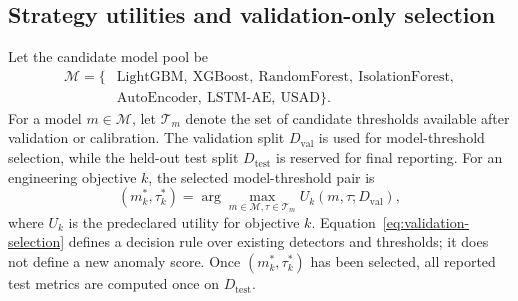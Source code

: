 \subsection{Strategy utilities and validation-only selection}

Let the candidate model pool be
\begin{equation}
\begin{aligned}
\mathcal{M}=\{&\mathrm{LightGBM},\ \mathrm{XGBoost},\ \mathrm{RandomForest},\ \mathrm{IsolationForest},\\
&\mathrm{AutoEncoder},\ \mathrm{LSTM\mbox{-}AE},\ \mathrm{USAD}\}.
\end{aligned}
\end{equation}
For a model $m\in\mathcal{M}$, let $\mathcal{T}_{m}$ denote the set of candidate thresholds available after validation or calibration. The validation split $D_{\mathrm{val}}$ is used for model-threshold selection, while the held-out test split $D_{\mathrm{test}}$ is reserved for final reporting. For an engineering objective $k$, the selected model-threshold pair is
\begin{equation}
(m^{*}_{k},\tau^{*}_{k})=\arg\max_{m\in\mathcal{M},\tau\in\mathcal{T}_{m}} U_{k}(m,\tau;D_{\mathrm{val}}),
\label{eq:validation-selection}
\end{equation}
where $U_k$ is the predeclared utility for objective $k$. Equation~\ref{eq:validation-selection} defines a decision rule over existing detectors and thresholds; it does not define a new anomaly score. Once $(m^{*}_{k},\tau^{*}_{k})$ has been selected, all reported test metrics are computed once on $D_{\mathrm{test}}$.


